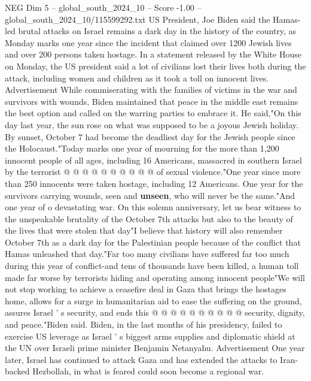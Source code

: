 \begin{textsample}{NEG Dim 5 – global\_south\_2024\_10 – Score -1.00 – global\_south\_2024\_10/115599292.txt}  \label{ex:f5_neg_131}
US President, Joe Biden said the Hamas-led brutal attacks on Israel remains a dark day in the history of the country, as Monday marks one year since the incident that claimed over 1200 Jewish lives and over 200 persons taken hostage.
In a statement released by the White House on Monday, the US president said a lot of civilians lost their lives both during the attack, including women and children as it took a toll on innocent lives.
Advertisement While commiserating with the families of victims in the war and survivors with wounds, Biden maintained that peace in the middle east remains the best option and called on the warring parties to embrace it.
He said,"On this day last year, the sun rose on what was supposed to be a joyous Jewish holiday.
By sunset, October 7 had become the deadliest day for the Jewish people since the Holocaust."Today marks one year of mourning for the more than 1,200 innocent people of all ages, including 16 Americans, massacred in southern Israel by the terrorist @ @ @ @ @ @ @ @ @ @ of sexual violence."One year since more than 250 innocents were taken hostage, including 12 Americans.
One year for the survivors carrying wounds, seen and \textbf{unseen}, who will never be the same."And one year of o devastating war.
On this solemn anniversary, let us bear witness to the unspeakable brutality of the October 7th attacks but also to the beauty of the lives that were stolen that day"I believe that history will also remember October 7th as a dark day for the Palestinian people because of the conflict that Hamas unleashed that day."Far too many civilians have suffered far too much during this year of conflict-and tens of thousands have been killed, a human toll made far worse by terrorists hiding and operating among innocent people"We will not stop working to achieve a ceasefire deal in Gaza that brings the hostages home, allows for a surge in humanitarian aid to ease the suffering on the ground, assures Israel ' s security, and ends this @ @ @ @ @ @ @ @ @ @ security, dignity, and peace."Biden said.
Biden, in the last months of his presidency, failed to exercise US leverage as Israel ' s biggest arms supplies and diplomatic shield at the UN over Israeli prime minister Benjamin Netanyahu.
Advertisement One year later, Israel has continued to attack Gaza and has extended the attacks to Iran-backed Hezbollah, in what is feared could soon become a regional war.

\end{textsample}
